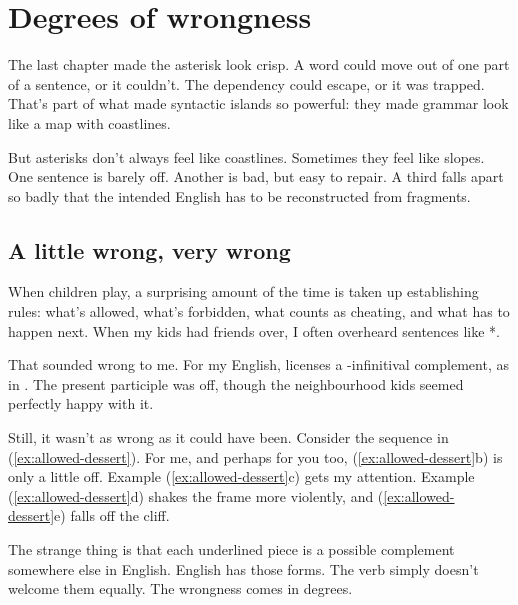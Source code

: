 \chapter{Degrees of wrongness}
\label{ch:degrees-wrongness}

The last chapter made the asterisk look crisp. A word could move out of one
part of a sentence, or it couldn't. The dependency could escape, or it was
trapped. That's part of what made syntactic islands so powerful: they made
grammar look like a map with coastlines.

But asterisks don't always feel like coastlines. Sometimes they feel like
slopes. One sentence is barely off. Another is bad, but easy to repair. A third
falls apart so badly that the intended English has to be reconstructed from
fragments.

\section{A little wrong, very wrong}

When children play, a surprising amount of the time is taken up establishing
rules: what's allowed, what's forbidden, what counts as cheating, and what
has to happen next. When my kids had friends over, I often overheard sentences
like *.

That sounded wrong to me. For my English,  licenses a
-infinitival complement, as in .
The present participle  was off, though the neighbourhood
kids seemed perfectly happy with it.

Still, it wasn't as wrong as it could have been. Consider the sequence in
(\ref{ex:allowed-dessert}).
\ea \label{ex:allowed-dessert}
    \z
\z
For me, and perhaps for you too, (\ref{ex:allowed-dessert}b) is only a
little off. Example (\ref{ex:allowed-dessert}c) gets my attention.
Example (\ref{ex:allowed-dessert}d) shakes the frame more violently, and
(\ref{ex:allowed-dessert}e) falls off the cliff.

The strange thing is that each underlined piece is a possible complement
somewhere else in English.
\ea \label{ex:allowed-variants}
    \z
\z
English has those forms. The verb  simply doesn't welcome them equally.
The wrongness comes in degrees.

